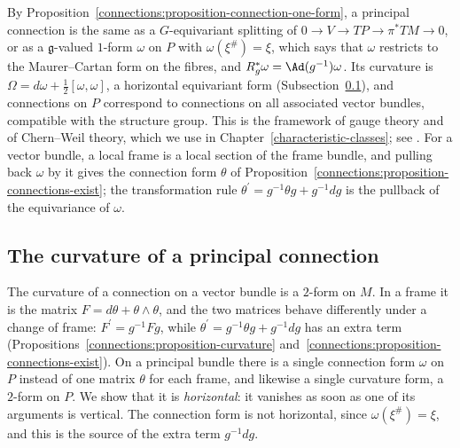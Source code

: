 \begin{remark}\label{connections:remark-principal-connections}
By Proposition~\ref{connections:proposition-connection-one-form}, a principal connection is the same as a $G$-equivariant splitting of
$0 \to V \to TP \to \pi^*TM \to 0$, or as a $\mathfrak{g}$-valued $1$-form $\omega$ on $P$ with $\omega(\xi^\#) = \xi$, which says that $\omega$ restricts to the Maurer--Cartan form on the fibres,
and $R_g^*\omega = \Ad(g^{-1})\omega$. Its curvature is $\Omega = d\omega + \frac12[\omega, \omega]$, a horizontal equivariant form (Subsection~\ref{connections:subsection-principal-curvature}), and connections on $P$ correspond to connections on all
associated vector bundles, compatible with the structure group. This is the framework of gauge theory and of Chern--Weil theory, which we use in Chapter~\ref{characteristic-classes}; see
\cite[Chapters I--II]{kobayashi-nomizu}. For a vector bundle, a local frame is a local section of the frame bundle, and pulling back $\omega$ by it gives the connection form
$\theta$ of Proposition~\ref{connections:proposition-connections-exist}; the transformation rule $\theta^{\prime} = g^{-1}\theta g + g^{-1}dg$ is the pullback of the equivariance of
$\omega$.
\end{remark}

\subsection{The curvature of a principal connection}\label{connections:subsection-principal-curvature}

The curvature of a connection on a vector bundle is a $2$-form on $M$. In a frame it is the matrix $F = d\theta + \theta \wedge \theta$, and the two matrices behave differently under a change of
frame: $F^{\prime} = g^{-1}Fg$, while $\theta^{\prime} = g^{-1}\theta g + g^{-1}dg$ has an extra term (Propositions~\ref{connections:proposition-curvature}
and~\ref{connections:proposition-connections-exist}). On a principal bundle there is a single connection form $\omega$ on $P$ instead of one matrix $\theta$ for each frame, and likewise a single
curvature form, a $2$-form on $P$. We show that it is \emph{horizontal}: it vanishes as soon as one of its arguments is vertical. The connection form is not horizontal, since $\omega(\xi^\#) = \xi$, and
this is the source of the extra term $g^{-1}dg$.

